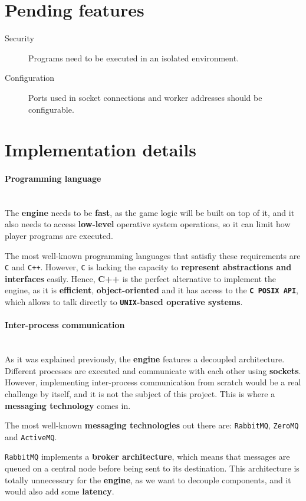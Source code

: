 \documentclass[a4paper,11pt,titlepage,abstract,numbers=noenddot,automark,mnsy,intlimits,rgb,dvipsnames]{report}
\begin{document}
\section{Pending features}
\begin{description}
\item[Security]
Programs need to be executed in an isolated environment.
\item[Configuration]
Ports used in socket connections and worker addresses should be configurable.
\end{description}
\section{Implementation details}
\paragraph{Programming language}
\hfill
\\[0.2cm]
\indent
The \textbf{engine} needs to be \textbf{fast}, as the game logic will be built on top of it, and it also needs to access
\textbf{low-level} operative system operations, so it can limit how player programs are executed.

The most well-known programming languages that satisfiy these requirements are \texttt{C} and \texttt{C++}. However, \texttt{C}  is lacking
the capacity to \textbf{represent abstractions and interfaces} easily. Hence, \textbf{C++} is the perfect alternative to implement
the engine, as it is \textbf{efficient}, \textbf{object-oriented} and it has access to the \textbf{\texttt{C POSIX API}}, which allows to talk
directly to \textbf{\texttt{UNIX}-based operative systems}.
\paragraph{Inter-process communication}
\hfill
\\[0.2cm]
\indent
As it was explained previously, the \textbf{engine} features a decoupled architecture. Different processes are
executed and communicate with each other using \textbf{sockets}. However, implementing inter-process communication from
scratch would be a real challenge by itself, and it is not the subject of this project. This is where a
\textbf{messaging technology} comes in.

The most well-known \textbf{messaging technologies} out there are: \texttt{RabbitMQ}, \texttt{ZeroMQ} and \texttt{ActiveMQ}.

\texttt{RabbitMQ} implements
a \textbf{broker architecture}, which means that messages are queued on a central node before being sent to its destination.
This architecture is totally unnecessary for the \textbf{engine}, as we want to decouple components, and it would also add
some \textbf{latency}.
\end{document}
